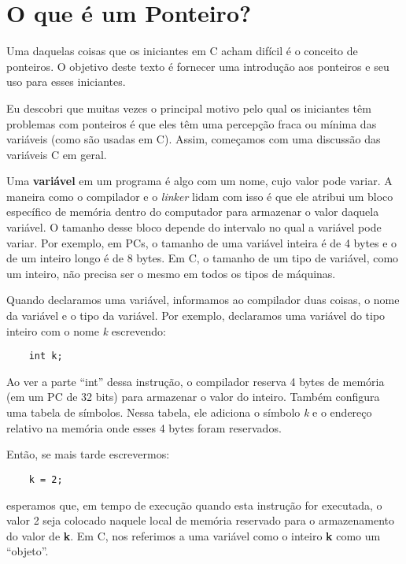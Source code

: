 
\chapter{O que é um Ponteiro?}
\lstcodestyle
Uma daquelas coisas que os iniciantes em C acham difícil é o conceito de ponteiros. O objetivo deste texto é fornecer uma introdução aos ponteiros e seu uso para esses iniciantes.

Eu descobri que muitas vezes o principal motivo pelo qual os iniciantes têm problemas com ponteiros é que eles têm uma percepção fraca ou mínima das variáveis (como são usadas em C). Assim, começamos com uma discussão das variáveis C em geral.

Uma \textbf{variável} em um programa é algo com um nome, cujo valor pode variar. A maneira como o compilador e o \textit{linker} lidam com isso é que ele atribui um bloco específico de memória dentro do computador para armazenar o valor daquela variável. O tamanho desse bloco depende do intervalo no qual a variável pode variar. Por exemplo, em PCs, o tamanho de uma variável inteira é de 4 bytes e o de um inteiro longo é de 8 bytes. Em C, o tamanho de um tipo de variável, como um inteiro, não precisa ser o mesmo em todos os tipos de máquinas.

Quando declaramos uma variável, informamos ao compilador duas coisas, o nome da variável e o tipo da variável. Por exemplo, declaramos uma variável do tipo inteiro com o nome \textit{k} escrevendo:

\begin{lstlisting}
	int k;
\end{lstlisting}

Ao ver a parte ``int'' dessa instrução, o compilador reserva 4 bytes de memória (em um PC de 32 bits) para armazenar o valor do inteiro. Também configura uma tabela de símbolos. Nessa tabela, ele adiciona o símbolo \textit{k} e o endereço relativo na memória onde esses 4 bytes foram reservados.

Então, se mais tarde escrevermos:
\begin{lstlisting}
	k = 2;
\end{lstlisting}
esperamos que, em tempo de execução quando esta instrução for executada, o valor 2 seja colocado naquele local de memória reservado para o armazenamento do valor de \textbf{k}. Em C, nos referimos a uma variável como o inteiro \textbf{k} como um ``objeto''.

